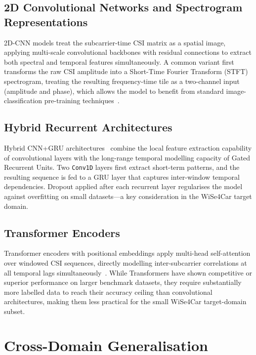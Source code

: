 \documentclass[english,bibtex]{kththesis}
\begin{document}
\subsection{2D Convolutional Networks and Spectrogram Representations}
\label{sec:models-2dcnn}

%
2D-CNN models treat the subcarrier-time CSI matrix as a spatial image, applying multi-scale convolutional backbones with residual connections to extract both spectral and temporal features simultaneously. A common variant first transforms the raw CSI amplitude into a Short-Time Fourier Transform (STFT) spectrogram, treating the resulting frequency-time tile as a two-channel input (amplitude and phase), which allows the model to benefit from standard image-classification pre-training techniques~\cite{elzein2024csi}.

\subsection{Hybrid Recurrent Architectures}
\label{sec:models-gru}

Hybrid CNN+GRU architectures~\cite{wakili2025evaluating} combine the local feature extraction capability of convolutional layers with the long-range temporal modelling capacity of Gated Recurrent Units. Two \texttt{Conv1D} layers first extract short-term patterns, and the resulting sequence is fed to a GRU layer that captures inter-window temporal dependencies. Dropout applied after each recurrent layer regularises the model against overfitting on small datasets---a key consideration in the WiSe4Car target domain.

\subsection{Transformer Encoders}
\label{sec:models-transformer}

Transformer encoders with positional embeddings apply multi-head self-attention over windowed CSI sequences, directly modelling inter-subcarrier correlations at all temporal lags simultaneously~\cite{yang2023sensefi}. While Transformers have shown competitive or superior performance on larger benchmark datasets, they require substantially more labelled data to reach their accuracy ceiling than convolutional architectures, making them less practical for the small WiSe4Car target-domain subset.

\section{Cross-Domain Generalisation}
\label{sec:crossdomain}
\end{document}
